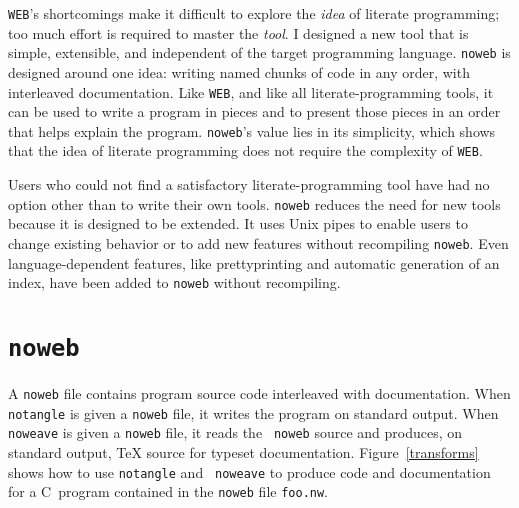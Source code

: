 {\tt WEB}'s shortcomings make it difficult to explore the {\em idea}
of literate programming; too much effort is required to master the
{\em tool}.
I designed a new tool that is
simple, extensible, and independent of the target programming language.
{\tt noweb} is designed
around one idea: writing named chunks of code in any order, with
interleaved documentation.
Like {\tt WEB}, and like all literate-programming tools, it can
be used to write a program in pieces and to present those pieces in
an order that helps explain the program.
{\tt noweb}'s value lies in its simplicity, which shows that the idea
of literate programming does not require the complexity of {\tt WEB}.

Users who could not find a satisfactory literate-programming tool
have had no option other than to write their own tools.
{\tt noweb} reduces the need for new tools because it is designed to
be extended.
It uses Unix pipes to enable users to change existing
behavior or to add new features {without} recompiling {\tt noweb}.
Even language-dependent features, like
prettyprinting and automatic generation of an index, have been added
to {\tt noweb} without recompiling.



\section{{\tt noweb}} %
A {\tt noweb} file contains program source code interleaved with documentation.
When {\tt notangle} is given a {\tt noweb} file, it writes the program
 on standard output.
When {\tt noweave} is given a {\tt noweb} file, it reads the {\tt
noweb} source and produces, on standard output, {\TeX} source for
typeset documentation.
Figure~\ref{transforms} shows how to use {\tt notangle} and {\tt
noweave} to produce code and documentation for a C~program contained
in the {\tt noweb} file {\tt foo.nw}.

